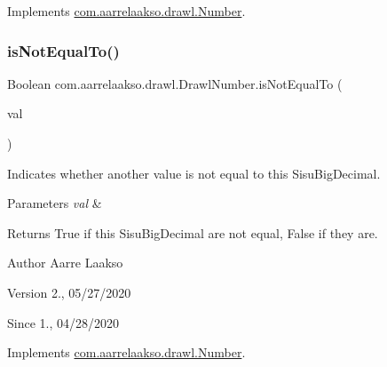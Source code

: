 Implements \hyperlink{interfacecom_1_1aarrelaakso_1_1drawl_1_1_number_a99ddc795a01b241e97345cfd6b85e00b}{com.\+aarrelaakso.\+drawl.\+Number}.

\mbox{\label{classcom_1_1aarrelaakso_1_1drawl_1_1_drawl_number_a9d60605e816e0cb6430545fa3ea28b19}} 
\subsubsection{\texorpdfstring{is\+Not\+Equal\+To()}{isNotEqualTo()}}
{\footnotesize\ttfamily Boolean com.\+aarrelaakso.\+drawl.\+Drawl\+Number.\+is\+Not\+Equal\+To (\begin{DoxyParamCaption}\item[{@Not\+Null final \hyperlink{interfacecom_1_1aarrelaakso_1_1drawl_1_1_number}{Number}}]{val }\end{DoxyParamCaption})}



Indicates whether another value is not equal to this Sisu\+Big\+Decimal. 


\begin{DoxyParams}{Parameters}
{\em val} & \\
\hline
\end{DoxyParams}
\begin{DoxyReturn}{Returns}
True if this Sisu\+Big\+Decimal are not equal, False if they are. 
\end{DoxyReturn}
\begin{DoxyAuthor}{Author}
Aarre Laakso 
\end{DoxyAuthor}
\begin{DoxyVersion}{Version}
2., 05/27/2020 
\end{DoxyVersion}
\begin{DoxySince}{Since}
1., 04/28/2020 
\end{DoxySince}


Implements \hyperlink{interfacecom_1_1aarrelaakso_1_1drawl_1_1_number_a4684335f60995aca55e4b972fbb3b8ca}{com.\+aarrelaakso.\+drawl.\+Number}.

\mbox{\label{classcom_1_1aarrelaakso_1_1drawl_1_1_drawl_number_ad26a515fb406363d921543b82c428b46}} 
